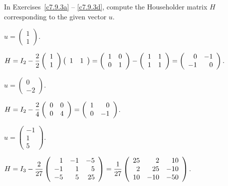 \documentclass{ximera}
\begin{document}
\TEXER

\noindent In Exercises~\ref{c7.9.3a} -- \ref{c7.9.3d}, compute the
Householder matrix $H$ corresponding to the given vector $u$.
\begin{exercise} \label{c7.9.3a}
$u = \left(\begin{array}{r} 1\\ 1 \end{array}\right)$.

\begin{solution}

$H = I_2 - \displaystyle\frac{2}{2}\left(\begin{array}{r} 1 \\ 1\end{array}\right)\left(\begin{array}{rr} 1 & 1
\end{array}\right) = \left(\begin{array}{rr} 1 & 0\\ 0 &1\end{array}\right) - \left(\begin{array}{rr} 1 & 1\\ 1 &1\end{array}\right)
= \left(\begin{array}{rr} 0 & -1\\ -1 &0\end{array}\right).$

\end{solution}
\end{exercise}
\begin{exercise} \label{c7.9.3b}
$u = \left(\begin{array}{r} 0\\ -2 \end{array}\right)$.

\begin{solution}

$H = I_2 - \displaystyle\frac{2}{4}\left(\begin{array}{rr} 0 & 0\\ 0 &4\end{array}\right) =
\left(\begin{array}{rr} 1 & 0\\ 0 &-1\end{array}\right)$.

\end{solution}
\end{exercise}
\begin{exercise} \label{c7.9.3c}
$u = \left(\begin{array}{r} -1\\ 1 \\5\end{array}\right)$.

\begin{solution}

$H = I_3 - \displaystyle\frac{2}{27}\left(\begin{array}{rrr} 1 & -1 & -5 \\ -1 & 1 & 5 \\ -5 & 5 & 25\end{array}\right)
= \frac{1}{27}\left(\begin{array}{rrr} 25 & 2 & 10 \\ 2 & 25 & -10 \\ 10 & -10 & -50\end{array}\right)$.

\end{solution}
\end{exercise}
\end{document}
